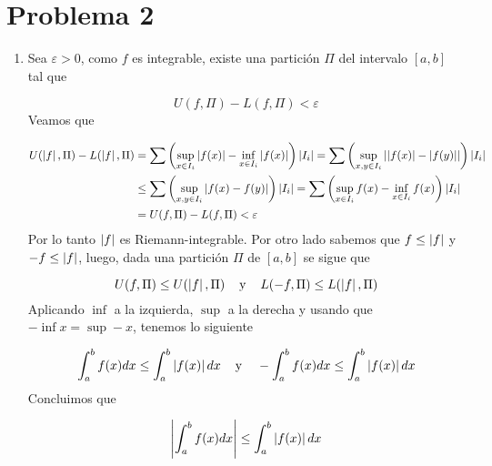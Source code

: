 \documentclass{article}
\begin{document}
\section*{Problema 2}
\begin{enumerate}
    \item Sea $\varepsilon>0$, como $f$ es integrable, existe una partición $\Pi$ del intervalo 
    $[a,b]$ tal que
    
    \begin{equation*}
        U(f,\Pi)-L(f,\Pi)<\varepsilon
    \end{equation*}
    Veamos que

    \begin{align*}
        U(\left|f \right|,\Pi)-L(\left|f \right|,\Pi) &= \sum \left(\sup_{x\in I_{i}}\left|f(x) \right|-
        \inf_{x\in I_{i}}\left|f(x) \right|\right)\left|I_{i} \right|=\sum \left(\sup_{x,y\in I_{i}}
        \left|\left|f(x) \right|-\left|f(y) \right| \right|\right)\left|I_{i} \right|\\
        & \leq\sum \left(\sup_{x,y\in I_{i}}\left|f(x)-f(y) \right|\right)\left|I_{i} \right|
        =\sum \left(\sup_{x\in I_{i}}f(x)-\inf_{x\in I_{i}}f(x)\right)\left|I_{i} \right| \\
        & =U(f,\Pi)-L(f,\Pi)<\varepsilon
    \end{align*}
    Por lo tanto $\left|f \right|$ es Riemann-integrable. Por otro lado sabemos que $f\leq\left|f \right|$ y 
    $-f\leq\left|f \right|$, luego, dada una partición $\Pi$ de $[a,b]$ se sigue que
    
    \begin{equation*}
        U(f,\Pi)\leq U(\left|f \right|,\Pi)\hspace{4mm}\text{y}\hspace{4mm}L(-f,\Pi)\leq L(\left|f \right|,\Pi)
    \end{equation*}
    Aplicando $\inf$ a la izquierda, $\sup$ a la derecha y usando que $-\inf x=\sup -x$, tenemos 
    lo siguiente

    \begin{equation*}
        \int_{a}^{b}f(x)dx\leq\int_{a}^{b}\left|f(x) \right|dx\hspace{4mm}\text{y}\hspace{4mm}
        -\int_{a}^{b}f(x)dx\leq\int_{a}^{b}\left|f(x) \right|dx
    \end{equation*}
    Concluimos que
    
    \begin{equation*}
        \left|\int_{a}^{b}f(x)dx \right|\leq\int_{a}^{b}\left|f(x) \right|dx
    \end{equation*}


\end{enumerate}
\end{document}
